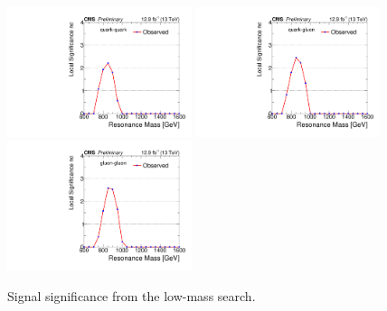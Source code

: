 \begin{figure}[hbtp]
  \centering
    \includegraphics[width=0.48\textwidth]{figs/dijet/signif_qq_calodijet2016.pdf}
    \includegraphics[width=0.48\textwidth]{figs/dijet/signif_qg_calodijet2016.pdf}
    \includegraphics[width=0.48\textwidth]{figs/dijet/signif_gg_calodijet2016.pdf}
    \caption{Signal significance from the low-mass search.}
    \label{figSignifLow}
\end{figure}

